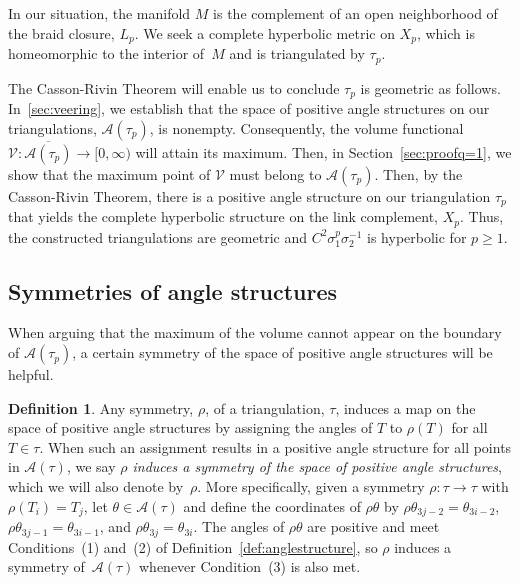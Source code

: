 \documentclass[reqno]{amsart}
\theoremstyle{plain}
\theoremstyle{definition}
\newtheorem{defn}{Definition}[section]
\begin{document}
In our situation, the manifold $M$ is the complement of an open neighborhood of the braid closure, $L_p$.  We seek a complete hyperbolic metric on $X_{p}$, which is homeomorphic to the interior of~$M$ and is triangulated by $\tau_{p}$. 

The Casson-Rivin Theorem will enable us to conclude $\tau_{p}$ is geometric as follows.  In~\ref{sec:veering}, we establish  that the space of positive angle structures on our triangulations, $\mathcal{A}(\tau_{p})$, is nonempty.  Consequently, the volume functional $\mathcal{V}:\overline{\mathcal{A}(\tau_{p})}\rightarrow[0,\infty)$ will attain its maximum.  Then, in Section~\ref{sec:proofq=1}, we show that the maximum point of $\mathcal{V}$ must belong to $\mathcal{A}(\tau_{p})$.  Then, by the Casson-Rivin Theorem, there is a positive angle structure on our triangulation $\tau_{p}$ that yields the complete hyperbolic structure on the link complement, $X_{p}$.  Thus, the constructed triangulations are geometric and $C^2\sigma_1^p\sigma_2^{-1}$ is hyperbolic for $p\ge1$.


\subsection{Symmetries of angle structures} \label{sec:symmetries}

When arguing that the maximum of the volume cannot appear on the boundary of $\mathcal{A}(\tau_{p})$, a certain symmetry of the space of positive angle structures will be helpful.

\begin{defn}\label{def:anglespacesymmetry}
Any symmetry, $\rho$, of a triangulation, $\tau$, induces a map on the space of positive angle structures by assigning the angles of $T$ to $\rho(T)$ for all $T\in\tau$.  When such an assignment results in a positive angle structure for all points in $\mathcal A(\tau)$, we say \emph{$\rho$ induces a symmetry of the space of positive angle structures}, which we will also denote by~$\rho$.  More specifically, given a symmetry $\rho:\tau\rightarrow\tau$ with $\rho(T_i)=T_j$, let $\theta\in\mathcal A(\tau)$ and define the coordinates of $\rho\theta$ by $\rho\theta_{3j-2}=\theta_{3i-2}$, $\rho\theta_{3j-1}=\theta_{3i-1}$, and $\rho\theta_{3j}=\theta_{3i}$. 
The angles of $\rho\theta$ are positive and meet Conditions~(1) and~(2) of Definition~\ref{def:anglestructure}, so $\rho$ induces a symmetry of~$\mathcal A(\tau)$ whenever Condition~(3) is also met.

\end{defn}
\end{document}

